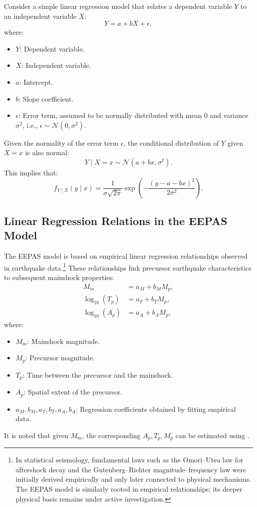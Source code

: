 \documentclass[linenum,doublespace,onecolumn]{SSA-SRL}
\theoremstyle{lemma}
\begin{document}
Consider a simple linear regression model that relates a dependent variable \( Y \) to an independent variable \( X \):
\begin{equation*}
Y = a + bX + \epsilon,
\end{equation*}
where:
\begin{itemize}
    \item \( Y \): Dependent variable.
    \item \( X \): Independent variable.
    \item \( a \): Intercept.
    \item \( b \): Slope coefficient.
    \item \( \epsilon \): Error term, assumed to be normally distributed with mean 0 and variance \( \sigma^2 \), i.e., \( \epsilon \sim \mathcal{N}(0, \sigma^2) \).
\end{itemize}
Given the normality of the error term \( \epsilon \), the conditional distribution of \( Y \) given \( X = x \) is also normal:
\begin{equation*}
Y \mid X = x \sim \mathcal{N}(a + b x, \sigma^2).
\end{equation*}
This implies that:
\begin{equation*}
f_{Y\mid X}(y \mid x) = \frac{1}{\sigma \sqrt{2\pi}} \exp\!\left( -\frac{(y - a - b x)^2}{2\sigma^2} \right).
\end{equation*}

\subsection{Linear Regression Relations in the EEPAS Model}

The EEPAS model is based on empirical linear regression relationships observed in earthquake data.\footnote{In statistical seismology, fundamental laws such as the Omori--Utsu law for aftershock decay and the Gutenberg--Richter magnitude--frequency law were initially derived empirically and only later connected to physical mechanisms. The EEPAS model is similarly rooted in empirical relationships; its deeper physical basis remains under active investigation.} 
These relationships link precursor earthquake characteristics to subsequent mainshock properties:
\begin{align}
M_m &= a_M + b_M M_p, \label{mag_r}\\
\log_{10}(T_p) &= a_T + b_T M_p, \label{time_r}\\
\log_{10}(A_p) &= a_A + b_A M_p, \label{spatial_r}
\end{align}
where:
\begin{itemize}
    \item \( M_m \): Mainshock magnitude.
    \item \( M_p \): Precursor magnitude.
    \item \( T_p \): Time between the precursor and the mainshock.
    \item \( A_p \): Spatial extent of the precursor.
    \item \( a_M, b_M, a_T, b_T, a_A, b_A \): Regression coefficients obtained by fitting empirical data.
\end{itemize}
It is noted that given $M_m$, the corresponding $A_p, T_p, M_p$ can be estimated using \cite{psi}.
\end{document}
